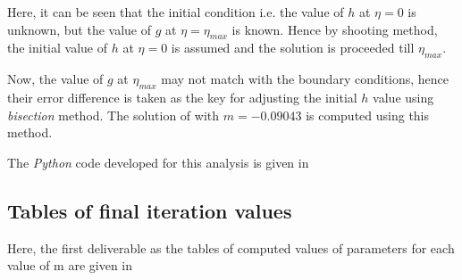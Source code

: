 \par Here, it can be seen that the initial condition i.e. the value of $h$ at
\(\eta = 0\) is unknown, but the value of $g$ at \(\eta = \eta_{max}\) is known.
Hence by shooting method, the initial value of $h$ at \(\eta = 0\) is assumed
and the solution is proceeded till $\eta_{max}$.

\par Now, the value of $g$ at $\eta_{max}$ may not match with the boundary
conditions, hence their error difference is taken as the key for adjusting
the initial $h$ value using \emph{bisection} method. The solution of
 with \(m = -0.09043\) is computed using this method.

\par The \emph{Python} code developed for this analysis is given in 

\subsection{Tables of final iteration values}
Here, the first deliverable as the tables of computed values of
parameters for each value of m are given in 


